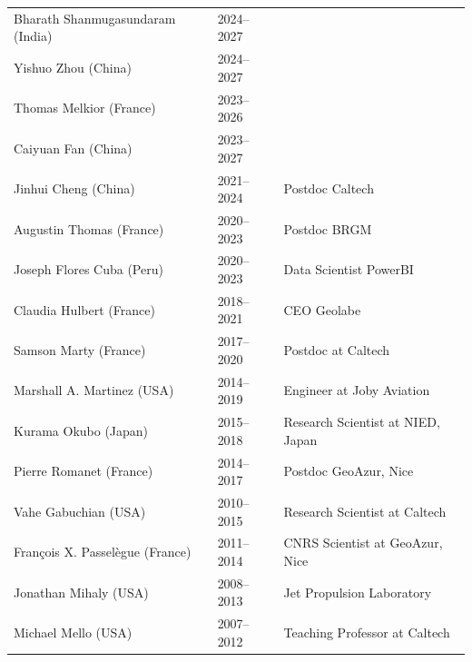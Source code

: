 \documentclass[10pt]{article}
\begin{document}
\begin{table}[h!]
\begin{tabular}{L{6cm}L{2cm}D{7cm}}
\color{groy}Bharath Shanmugasundaram (India)    & 2024–2027&   \\
\color{groy}Yishuo Zhou (China)           		& 2024–2027&   \\
\color{groy}Thomas Melkior (France)       		& 2023–2026&   \\
\color{groy}Caiyuan Fan (China)          		& 2023–2027&   \\
\color{black}Jinhui Cheng (China)         		& 2021–2024&   Postdoc Caltech\\
\color{black}Augustin Thomas (France)      		& 2020–2023&   Postdoc BRGM \\
\color{black}Joseph Flores Cuba (Peru)   		& 2020–2023&   Data Scientist PowerBI\\
\color{black}Claudia Hulbert (France)   	  		& 2018–2021&  CEO Geolabe\\
\color{black}Samson Marty (France)    	      	& 2017–2020&  Postdoc at Caltech\\
\color{black}Marshall A. Martinez (USA)  		& 2014–2019&  Engineer at Joby Aviation \\
\color{black}Kurama Okubo (Japan)   	      		& 2015–2018&  Research Scientist at NIED, Japan\\
\color{black}Pierre Romanet (France)        		& 2014–2017&  Postdoc GeoAzur, Nice\\
\color{black}Vahe Gabuchian (USA)       			& 2010–2015&  Research Scientist at Caltech\\
\color{black}François X. Passelègue (France)		& 2011–2014&  CNRS Scientist at GeoAzur, Nice\\
\color{black}Jonathan Mihaly (USA)        		& 2008–2013&  Jet Propulsion Laboratory\\
\color{black}Michael Mello (USA)          		& 2007–2012&  Teaching Professor at Caltech\\[16pt]
\end{tabular}



\end{table}
\end{document}
